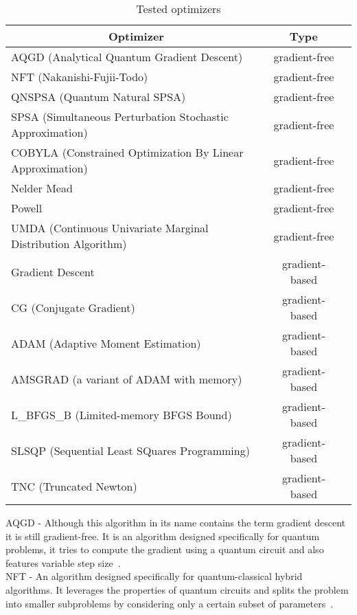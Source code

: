 \begin{table}[H]
    \centering
    \caption{Tested optimizers}
    \begin{tabular}{|l|c|c|} 
        \hline
        \multicolumn{1}{|c|}{\textbf{Optimizer}} & \textbf{Type}\\
        \hline
        AQGD (Analytical Quantum Gradient Descent) & gradient-free \\ 
        \hline
        NFT (Nakanishi-Fujii-Todo) & gradient-free \\ 
        \hline
        QNSPSA (Quantum Natural SPSA) & gradient-free \\ 
        \hline
        SPSA (Simultaneous Perturbation Stochastic Approximation) & gradient-free \\ 
        \hline
        COBYLA (Constrained Optimization By Linear Approximation) & gradient-free \\ 
        \hline
        Nelder Mead & gradient-free \\ 
        \hline
        Powell & gradient-free \\ 
        \hline
        UMDA (Continuous Univariate Marginal Distribution Algorithm) & gradient-free \\ 
        \hline
        Gradient Descent & gradient-based \\ 
        \hline
        CG (Conjugate Gradient) & gradient-based \\ 
        \hline
        ADAM (Adaptive Moment Estimation) & gradient-based \\ 
        \hline
        AMSGRAD (a variant of ADAM with memory) & gradient-based \\ 
        \hline
        L\_BFGS\_B (Limited-memory BFGS Bound) & gradient-based \\ 
        \hline
        SLSQP (Sequential Least SQuares Programming) & gradient-based \\ 
        \hline
        TNC (Truncated Newton) & gradient-based \\ 
        \hline
    \end{tabular}
    \label{tab:optimizers}
\end{table}
AQGD - Although this algorithm in its name contains the term gradient descent it is still gradient-free. It is an algorithm designed specifically for quantum problems, it tries to compute the gradient using a quantum circuit and also features variable step size~\cite{aqgd}.\\
NFT - An algorithm designed specifically for quantum-classical hybrid algorithms. It leverages the properties of quantum circuits and splits the problem into smaller subproblems by considering only a certain subset of parameters~\cite{nft}.\\
